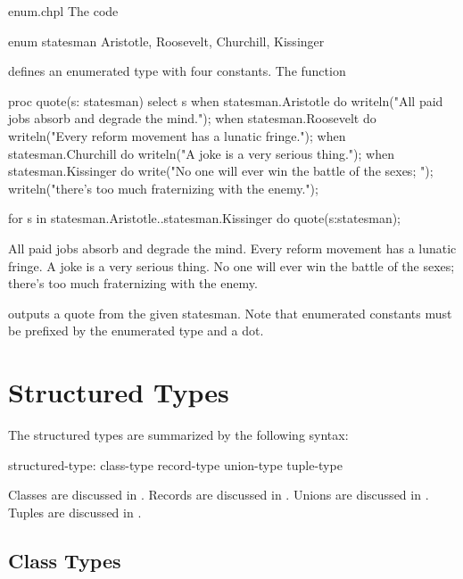 \begin{chapelexample}{enum.chpl}
The code
\begin{chapel}
enum statesman { Aristotle, Roosevelt, Churchill, Kissinger }
\end{chapel}
defines an enumerated type with four constants.  The function
\begin{chapel}
proc quote(s: statesman) {
  select s {
    when statesman.Aristotle do
       writeln("All paid jobs absorb and degrade the mind.");
    when statesman.Roosevelt do
       writeln("Every reform movement has a lunatic fringe.");
    when statesman.Churchill do
       writeln("A joke is a very serious thing.");
    when statesman.Kissinger do
       { write("No one will ever win the battle of the sexes; ");
         writeln("there's too much fraternizing with the enemy."); }
  }
}
\end{chapel}
\begin{chapelnoprint}
for s in statesman.Aristotle..statesman.Kissinger do
  quote(s:statesman);
\end{chapelnoprint}
\begin{chapeloutput}
All paid jobs absorb and degrade the mind.
Every reform movement has a lunatic fringe.
A joke is a very serious thing.
No one will ever win the battle of the sexes; there's too much fraternizing with the enemy.
\end{chapeloutput}
outputs a quote from the given statesman.  Note that enumerated
constants must be prefixed by the enumerated type and a dot.
\end{chapelexample}


\clearpage
\section{Structured Types}
\label{Structured_Types}

The structured types are summarized by the following syntax:

\begin{syntax}
structured-type:
  class-type
  record-type
  union-type
  tuple-type
\end{syntax}

Classes are discussed in .  Records are discussed
in .  Unions are discussed in .  Tuples are
discussed in .

\subsection{Class Types}
\label{Types_Class_Types}

